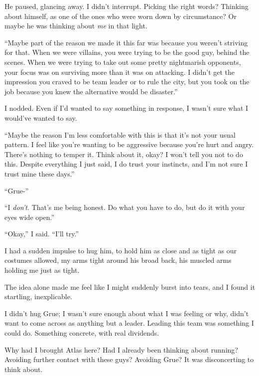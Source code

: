 He paused, glancing away.  I didn't interrupt.  Picking the right words?  Thinking about himself, as one of the ones who were worn down by circumstance?  Or maybe he was thinking about \emph{me} in that light.



``Maybe part of the reason we made it this far was because you weren't striving for that.  When we were villains, you were trying to be the good guy, behind the scenes.  When we were trying to take out some pretty nightmarish opponents, your focus was on surviving more than it was on attacking.  I didn't get the impression you craved to be team leader or to rule the city, but you took on the job because you knew the alternative would be disaster.''



I nodded.  Even if I'd wanted to say something in response, I wasn't sure what I would've wanted to say.



``Maybe the reason I'm less comfortable with this is that it's not your usual pattern.  I feel like you're wanting to be aggressive because you're hurt and angry.  There's nothing to temper it.  Think about it, okay?  I won't tell you not to do this.  Despite everything I just said, I do trust your instincts, and I'm not sure I trust mine these days.''



``Grue-''



``I \emph{don't}.  That's me being honest.  Do what you have to do, but do it with your eyes wide open.''



``Okay,'' I said.  ``I'll try.''



I had a sudden impulse to hug him, to hold him as close and as tight as our costumes allowed, my arms tight around his broad back, his muscled arms holding me just as tight.



The idea alone made me feel like I might suddenly burst into tears, and I found it startling, inexplicable.



I didn't hug Grue; I wasn't sure enough about what I was feeling or why, didn't want to come across as anything but a leader.  Leading this team was something I could do.  Something concrete, with real dividends.



Why had I brought Atlas here?  Had I already been thinking about running?  Avoiding further contact with these guys?  Avoiding Grue?  It was disconcerting to think about.



